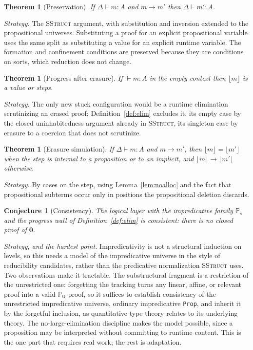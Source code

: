 \documentclass[11pt]{article}
\newcommand{\Prop}[1]{\mathbb{P}_{#1}}            %
\newcommand{\zero}{\mathbf{0}}                    %
\newcommand{\erase}[1]{\lfloor #1 \rfloor}
\newcommand{\step}{\longrightarrow}
\newcommand{\smdsh}{\mathrel{\vdash}}
\theoremstyle{definition}
\theoremstyle{plain}
\newtheorem{theorem}[definition]{Theorem}
\newtheorem{conjecture}[definition]{Conjecture}
\begin{document}
\begin{theorem}[Preservation]
If $\Delta\smdsh m:A$ and $m\step m'$ then $\Delta\smdsh m':A$.
\end{theorem}
\noindent\emph{Strategy.} The \textsc{SStruct} argument, with substitution and
inversion extended to the propositional universes. Substituting a proof for an explicit
propositional variable uses the same split as substituting a value for an
explicit runtime variable. The formation and confinement conditions are
preserved because they are conditions on sorts, which reduction does not change.

\begin{theorem}[Progress after erasure]
If ${}\smdsh m:A$ in the empty context then $\erase{m}$ is a value or steps.
\end{theorem}
\noindent\emph{Strategy.} The only new stuck configuration would be a runtime
elimination scrutinizing an erased proof; Definition~\ref{def:elim} excludes it,
its empty case by the closed uninhabitedness argument already in \textsc{SStruct},
its singleton case by erasure to a coercion that does not scrutinize.

\begin{theorem}[Erasure simulation]
If $\Delta\smdsh m:A$ and $m\step m'$, then $\erase{m}=\erase{m'}$ when the step
is internal to a proposition or to an implicit, and $\erase{m}\step\erase{m'}$
otherwise.
\end{theorem}
\noindent\emph{Strategy.} By cases on the step, using Lemma~\ref{lem:noalloc} and
the fact that propositional subterms occur only in positions the propositional
deletion discards.

\begin{conjecture}[Consistency]\label{conj:consistency}
The logical layer with the impredicative family $\Prop{s}$ and the progress wall
of Definition~\ref{def:elim} is consistent: there is no closed proof of $\zero$.
\end{conjecture}
\noindent\emph{Strategy, and the hardest point.} Impredicativity is not a
structural induction on levels, so this needs a model of the impredicative universe
in the style of reducibility candidates, rather than the predicative normalization
\textsc{SStruct} uses. Two observations make it tractable. The substructural
fragment is a restriction of the unrestricted one: forgetting the tracking turns
any linear, affine, or relevant proof into a valid $\Prop{\mathsf{U}}$ proof, so it
suffices to establish consistency of the unrestricted impredicative universe,
ordinary impredicative \texttt{Prop}, and inherit it by the forgetful inclusion, as
quantitative type theory relates to its underlying theory. The
no-large-elimination discipline makes the model possible, since a proposition may
be interpreted without committing to runtime content. This is the one part that
requires real work; the rest is adaptation.
\end{document}

